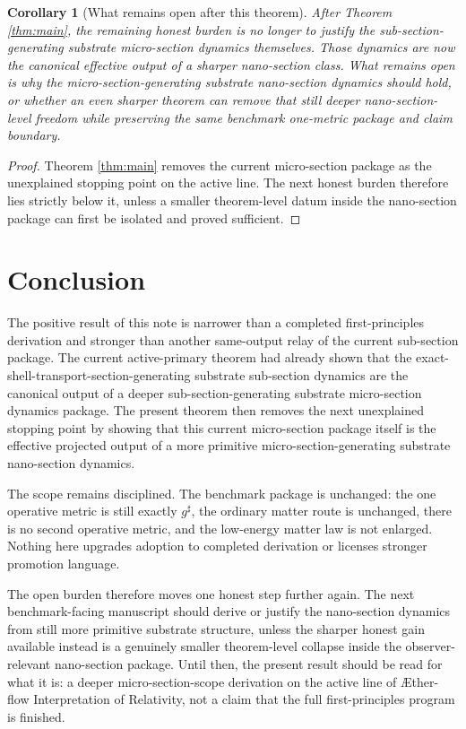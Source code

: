 \documentclass[11pt]{article}
\newcommand{\Aflow}{\AE{}ther-flow}
\newcommand{\TheoryName}{\Aflow{} Interpretation of Relativity}
\newcommand{\CompletedMetric}{g^{\sharp}}
\newtheorem{corollary}{Corollary}
\begin{document}
\begin{corollary}[What remains open after this theorem]
\label{cor:next}
After Theorem \ref{thm:main}, the remaining honest burden is no longer to justify the sub-section-generating substrate micro-section dynamics themselves. Those dynamics are now the canonical effective output of a sharper nano-section class. What remains open is why the micro-section-generating substrate nano-section dynamics should hold, or whether an even sharper theorem can remove that still deeper nano-section-level freedom while preserving the same benchmark one-metric package and claim boundary.
\end{corollary}

\begin{proof}
Theorem \ref{thm:main} removes the current micro-section package as the unexplained stopping point on the active line. The next honest burden therefore lies strictly below it, unless a smaller theorem-level datum inside the nano-section package can first be isolated and proved sufficient.
\end{proof}

\section{Conclusion}

The positive result of this note is narrower than a completed first-principles derivation and stronger than another same-output relay of the current sub-section package. The current active-primary theorem had already shown that the exact-shell-transport-section-generating substrate sub-section dynamics are the canonical output of a deeper sub-section-generating substrate micro-section dynamics package. The present theorem then removes the next unexplained stopping point by showing that this current micro-section package itself is the effective projected output of a more primitive micro-section-generating substrate nano-section dynamics.

The scope remains disciplined. The benchmark package is unchanged: the one operative metric is still exactly \(\CompletedMetric\), the ordinary matter route is unchanged, there is no second operative metric, and the low-energy matter law is not enlarged. Nothing here upgrades adoption to completed derivation or licenses stronger promotion language.

The open burden therefore moves one honest step further again. The next benchmark-facing manuscript should derive or justify the nano-section dynamics from still more primitive substrate structure, unless the sharper honest gain available instead is a genuinely smaller theorem-level collapse inside the observer-relevant nano-section package. Until then, the present result should be read for what it is: a deeper micro-section-scope derivation on the active line of \TheoryName{}, not a claim that the full first-principles program is finished.
\end{document}
